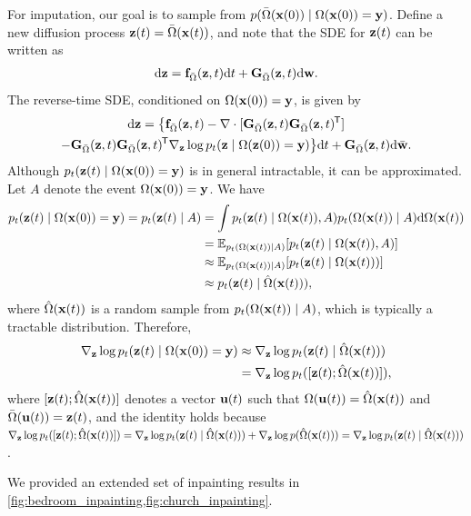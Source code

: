 For imputation, our goal is to sample from $p({\bar{\Omega}}(\mathbf{x}(0)) \mid \Omega(\mathbf{x}(0)) = \mathbf{y})$. Define a new diffusion process $\mathbf{z}(t) = {\bar{\Omega}}(\mathbf{x}(t))$, and note that the SDE for $\mathbf{z}(t)$ can be written as
\begin{align*}
\mathrm{d} \mathbf{z} = \mathbf{f}_{\bar{\Omega}}(\mathbf{z}, t) \mathrm{d} t + \mathbf{G}_{\bar{\Omega}}(\mathbf{z}, t) \mathrm{d} \mathbf{w}.
\end{align*}
The reverse-time SDE, conditioned on $\Omega(\mathbf{x}(0)) = \mathbf{y}$, is given by
\begin{multline*}
\mathrm{d}\mathbf{z} = \big\{\mathbf{f}_{\bar{\Omega}}(\mathbf{z}, t) - \nabla \cdot [\mathbf{G}_{{\bar{\Omega}}}(\mathbf{z}, t) \mathbf{G}_{{\bar{\Omega}}}(\mathbf{z},t)^{\mkern-1.5mu\mathsf{T}}] \\- \mathbf{G}_{\bar{\Omega}}(\mathbf{z}, t)\mathbf{G}_{\bar{\Omega}}(\mathbf{z}, t)^{\mkern-1.5mu\mathsf{T}} \nabla_{\mathbf{z}} \log p_t(\mathbf{z} \mid \Omega(\mathbf{z}(0)) = \mathbf{y})\big\}\mathrm{d} t + \mathbf{G}_{\bar{\Omega}}(\mathbf{z}, t)\mathrm{d}\bar{\mathbf{w}}.
\end{multline*}
Although $p_t(\mathbf{z}(t) \mid \Omega(\mathbf{x}(0)) = \mathbf{y})$ is in general intractable, it can be approximated. Let $A$ denote the event $\Omega(\mathbf{x}(0)) = \mathbf{y} $. We have
\begin{align*}
p_t(\mathbf{z}(t) \mid \Omega(\mathbf{x}(0)) = \mathbf{y}) = p_t(\mathbf{z}(t) \mid A) &= \int p_t(\mathbf{z}(t) \mid \Omega(\mathbf{x}(t)), A) p_t(\Omega(\mathbf{x}(t)) \mid A) \mathrm{d} \Omega(\mathbf{x}(t)) \\
&= \mathbb{E}_{p_t(\Omega(\mathbf{x}(t)) \mid A)}[p_t(\mathbf{z}(t) \mid \Omega(\mathbf{x}(t)), A)]\\
&\approx \mathbb{E}_{p_t(\Omega(\mathbf{x}(t)) \mid A)}[p_t(\mathbf{z}(t) \mid \Omega(\mathbf{x}(t)))]\\
&\approx p_t(\mathbf{z}(t) \mid \hat{\Omega}(\mathbf{x}(t))),
\end{align*}
where $\hat{\Omega}(\mathbf{x}(t))$ is a random sample from $p_t(\Omega(\mathbf{x}(t)) \mid A)$, which is typically a tractable distribution. Therefore,
\begin{align*}
\nabla_{\mathbf{z}} \log p_t(\mathbf{z}(t) \mid \Omega(\mathbf{x}(0))=\mathbf{y}) &\approx \nabla_{\mathbf{z}} \log p_t(\mathbf{z}(t) \mid \hat{\Omega}(\mathbf{x}(t))) \\
&= \nabla_{\mathbf{z}} \log p_t([\mathbf{z}(t); \hat{\Omega}(\mathbf{x}(t))]),
\end{align*}
where $[\mathbf{z}(t); \hat{\Omega}(\mathbf{x}(t))]$ denotes a vector $\mathbf{u}(t)$ such that $\Omega(\mathbf{u}(t)) = \hat{\Omega}(\mathbf{x}(t))$ and $\bar{\Omega}(\mathbf{u}(t)) = \mathbf{z}(t)$, and the identity holds because $\nabla_{\mathbf{z}} \log p_t([\mathbf{z}(t); \hat{\Omega}(\mathbf{x}(t))]) = \nabla_{\mathbf{z}} \log p_t(\mathbf{z}(t) \mid \hat{\Omega}(\mathbf{x}(t))) + \nabla_{\mathbf{z}} \log p(\hat{\Omega}(\mathbf{x}(t))) = \nabla_{\mathbf{z}} \log p_t(\mathbf{z}(t) \mid \hat{\Omega}(\mathbf{x}(t)))$.

We provided an extended set of inpainting results in \cref{fig:bedroom_inpainting,fig:church_inpainting}.

